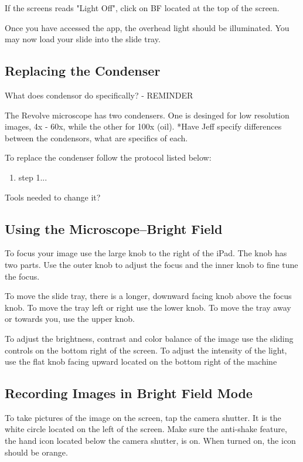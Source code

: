 \documentclass[12pt]{../SOP3_beta}
\begin{document}
\NP If the screens reads "Light Off", click on BF located at the top of the screen.

\NP Once you have accessed the app, the overhead light should be illuminated. You may now load your slide into the slide tray.
 
 
\subsection*{Replacing the Condenser}

\NP What does condensor do specifically? - REMINDER

\NP The Revolve microscope has two condensers. One is desinged for low resolution images, 4x - 60x, while the other for 100x (oil). 
*Have Jeff specify differences between the condensors, what are specifics of each.

\NP To replace the condenser follow the protocol listed below: 

\begin{enumerate}
  \item step 1...
\end{enumerate}

Tools needed to change it?
  
\subsection*{Using the Microscope--Bright Field} 

\NP To focus your image use the large knob to the right of the iPad. The knob has two parts. Use the outer knob to adjust the focus and the inner knob to fine tune the focus.

\NP To move the slide tray, there is a longer, downward facing knob above the focus knob. To move the tray left or right use the lower knob. To move the tray away or towards you, use the upper knob.

\NP To adjust the brightness, contrast and color balance of the image use the sliding controls on the bottom right of the screen. To adjust the intensity of the light, use the flat knob facing upward located on the bottom right of the machine
  

\subsection*{Recording Images in Bright Field Mode}

\NP To take pictures of the image on the screen, tap the camera shutter. It is the white circle located on the left of the screen. Make sure the anti-shake feature, the hand icon located below the camera shutter, is on. When turned on, the icon should be orange.
\end{document}
